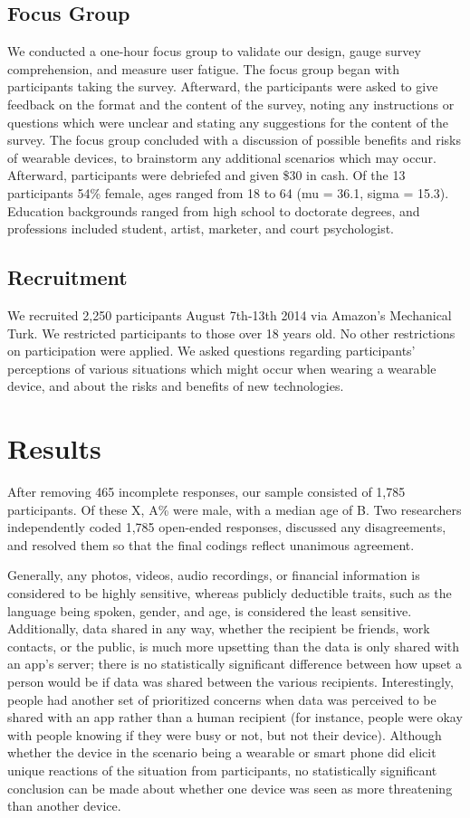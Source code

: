 \documentclass{acm_proc_article-sp}
\begin{document}
\subsection{Focus Group}
We conducted a one-hour focus group to validate our design, gauge survey comprehension, and measure user fatigue. The focus group began with participants taking the survey. Afterward, the participants were asked to give feedback on the format and the content of the survey, noting any instructions or questions which were unclear and stating any suggestions for the content of the survey. The focus group concluded with a discussion of possible benefits and risks of wearable devices, to brainstorm any additional scenarios which may occur. Afterward, participants were debriefed and given \$30 in cash. Of the 13 participants 54\% female, ages ranged from 18 to 64 (mu = 36.1, sigma = 15.3).  Education backgrounds ranged from high school to doctorate degrees, and professions included student, artist, marketer, and court psychologist.

\subsection{Recruitment}
We recruited 2,250 participants August 7th-13th 2014 via Amazon's Mechanical Turk. We restricted participants to those over 18 years old. No other restrictions on participation were applied. We asked questions regarding participants' perceptions of various situations which might occur when wearing a wearable device, and about the risks and benefits of new technologies.


\section{Results}
After removing 465 incomplete responses, our sample consisted of 1,785 participants. Of these X, A\% were male, with a median age of B. Two researchers independently coded 1,785 open-ended responses, discussed any disagreements, and resolved them so that the final codings reflect unanimous agreement. 

Generally, any photos, videos, audio recordings, or financial information is considered to be highly sensitive, whereas publicly deductible traits, such as the language being spoken, gender, and age, is considered the least sensitive.  Additionally, data shared in any way, whether the recipient be friends, work contacts, or the public, is much more upsetting than the data is only shared with an app's server; there is no statistically significant difference between how upset a person would be if data was shared between the various recipients. Interestingly, people had another set of prioritized concerns when data was perceived to be shared with an app rather than a human recipient (for instance, people were okay with people knowing if they were busy or not, but not their device). Although whether the device in the scenario being a wearable or smart phone did elicit unique reactions of the situation from participants, no statistically significant conclusion can be made about whether one device was seen as more threatening than another device. 
\end{document}
